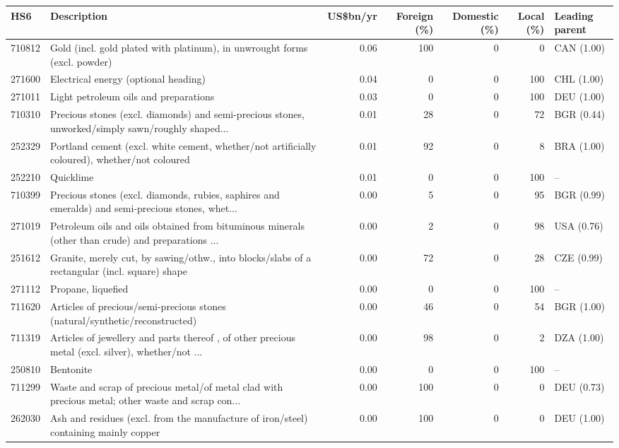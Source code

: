\begin{tabular}{@{}l p{6.4cm} r r r r l@{}}
\toprule
HS6 & Description & US\$bn/yr & Foreign (\%) & Domestic (\%) & Local (\%) & Leading parent \\
\midrule
710812 & Gold (incl. gold plated with platinum), in unwrought forms (excl. powder) & 0.06 & 100 & 0 & 0 & CAN (1.00) \\
271600 & Electrical energy (optional heading) & 0.04 & 0 & 0 & 100 & CHL (1.00) \\
271011 & Light petroleum oils and preparations & 0.03 & 0 & 0 & 100 & DEU (1.00) \\
710310 & Precious stones (excl. diamonds) and semi-precious stones, unworked/\allowbreak{}simply sawn/\allowbreak{}roughly shaped... & 0.01 & 28 & 0 & 72 & BGR (0.44) \\
252329 & Portland cement (excl. white cement, whether/\allowbreak{}not artificially coloured), whether/\allowbreak{}not coloured & 0.01 & 92 & 0 & 8 & BRA (1.00) \\
252210 & Quicklime & 0.01 & 0 & 0 & 100 & -- \\
710399 & Precious stones (excl. diamonds, rubies, saphires and emeralds) and semi-precious stones, whet... & 0.00 & 5 & 0 & 95 & BGR (0.99) \\
271019 & Petroleum oils and oils obtained from bituminous minerals (other than crude) and preparations ... & 0.00 & 2 & 0 & 98 & USA (0.76) \\
251612 & Granite, merely cut, by sawing/\allowbreak{}othw., into blocks/\allowbreak{}slabs of a rectangular (incl. square) shape & 0.00 & 72 & 0 & 28 & CZE (0.99) \\
271112 & Propane, liquefied & 0.00 & 0 & 0 & 100 & -- \\
711620 & Articles of precious/\allowbreak{}semi-precious stones (natural/\allowbreak{}synthetic/\allowbreak{}reconstructed) & 0.00 & 46 & 0 & 54 & BGR (1.00) \\
711319 & Articles of jewellery and parts thereof , of other precious metal (excl. silver), whether/\allowbreak{}not ... & 0.00 & 98 & 0 & 2 & DZA (1.00) \\
250810 & Bentonite & 0.00 & 0 & 0 & 100 & -- \\
711299 & Waste and scrap of precious metal/\allowbreak{}of metal clad with precious metal; other waste and scrap con... & 0.00 & 100 & 0 & 0 & DEU (0.73) \\
262030 & Ash and residues (excl. from the manufacture of iron/\allowbreak{}steel) containing mainly copper & 0.00 & 100 & 0 & 0 & DEU (1.00) \\
\bottomrule
\end{tabular}
